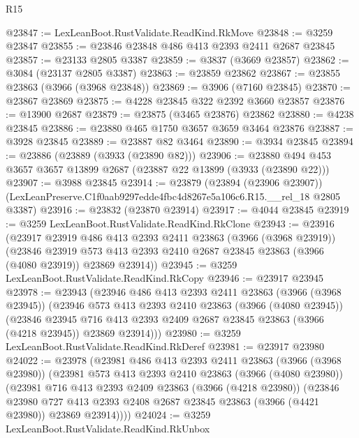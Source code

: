 \begin{lexlean}{R15}
\begin{coremodule}
@23847 := LexLeanBoot.RustValidate.ReadKind.RkMove
@23848 := @3259 @23847
@23855 := @23846 @23848 @486 @413 @2393 @2411 @2687 @23845
@23857 := @23133 @2805 @3387
@23859 := @3837 (@3669 @23857)
@23862 := @3084 (@23137 @2805 @3387)
@23863 := @23859 @23862
@23867 := @23855 @23863 (@3966 (@3968 @23848))
@23869 := @3906 (@7160 @23845)
@23870 := @23867 @23869
@23875 := @4228 @23845 @322 @2392 @3660 @23857
@23876 := @13900 @2687
@23879 := @23875 (@3465 @23876) @23862
@23880 := @4238 @23845
@23886 := @23880 @465 @1750 @3657 @3659 @3464 @23876
@23887 := @3928 @23845
@23889 := @23887 @82 @3464
@23890 := @3934 @23845
@23894 := @23886 (@23889 (@3933 (@23890 @82)))
@23906 := @23880 @494 @453 @3657 @3657 @13899 @2687 (@23887 @22 @13899 (@3933 (@23890 @22)))
@23907 := @3988 @23845
@23914 := @23879
    (@23894 (@23906 @23907))
    (LexLeanPreserve.C1f0aab9297edde4fbc4d8267e5a106c6.R15.__rel_18 @2805 @3387)
@23916 := @23832 (@23870 @23914)
@23917 := @4044 @23845
@23919 := @3259 LexLeanBoot.RustValidate.ReadKind.RkClone
@23943 := @23916
    (@23917
      @23919
      @486
      @413
      @2393
      @2411
      @23863
      (@3966 (@3968 @23919))
      (@23846
        @23919
        @573
        @413
        @2393
        @2410
        @2687
        @23845
        @23863
        (@3966 (@4080 @23919))
        @23869
        @23914))
@23945 := @3259 LexLeanBoot.RustValidate.ReadKind.RkCopy
@23946 := @23917 @23945
@23978 := @23943
    (@23946
      @486
      @413
      @2393
      @2411
      @23863
      (@3966 (@3968 @23945))
      (@23946
        @573
        @413
        @2393
        @2410
        @23863
        (@3966 (@4080 @23945))
        (@23846
          @23945
          @716
          @413
          @2393
          @2409
          @2687
          @23845
          @23863
          (@3966 (@4218 @23945))
          @23869
          @23914)))
@23980 := @3259 LexLeanBoot.RustValidate.ReadKind.RkDeref
@23981 := @23917 @23980
@24022 := @23978
    (@23981
      @486
      @413
      @2393
      @2411
      @23863
      (@3966 (@3968 @23980))
      (@23981
        @573
        @413
        @2393
        @2410
        @23863
        (@3966 (@4080 @23980))
        (@23981
          @716
          @413
          @2393
          @2409
          @23863
          (@3966 (@4218 @23980))
          (@23846
            @23980
            @727
            @413
            @2393
            @2408
            @2687
            @23845
            @23863
            (@3966 (@4421 @23980))
            @23869
            @23914))))
@24024 := @3259 LexLeanBoot.RustValidate.ReadKind.RkUnbox

\end{coremodule}
\end{lexlean}
